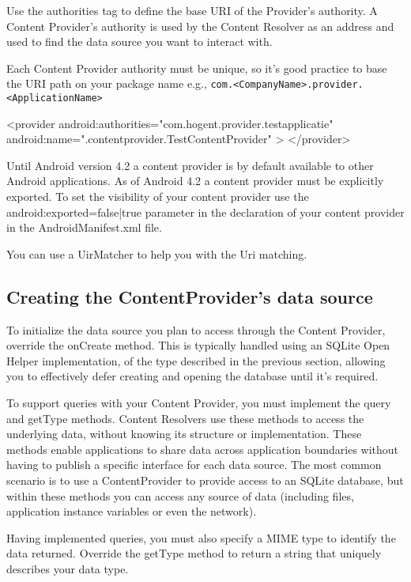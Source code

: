 Use the authorities tag to define the base URI of the Provider’s authority. A Content Provider’s authority is used by the Content Resolver as an address and used to find the data source you want to interact with.

\begin{framed}
Each Content Provider authority must be unique, so it’s good practice to base the URI path on your package name e.g., \texttt{com.<CompanyName>.provider.<ApplicationName>}
\end{framed}

\begin{xml}
<provider
android:authorities="com.hogent.provider.testapplicatie"
android:name=".contentprovider.TestContentProvider" >
</provider>
\end{xml}

Until Android version 4.2 a content provider is by default available to other Android applications. As of Android 4.2 a content provider must be explicitly exported. To set the visibility of your content provider use the android:exported=false|true parameter in the declaration of your content provider in the AndroidManifest.xml file.

You can use a UirMatcher to help you with the Uri matching.

\subsection{Creating the ContentProvider's data source}
To initialize the data source you plan to access through the Content Provider, override the onCreate method. This is typically handled using an SQLite Open Helper implementation, of the type described in the previous section, allowing you to effectively defer creating and opening the database until it’s required.

To support queries with your Content Provider, you must implement the query and getType methods. Content Resolvers use these methods to access the underlying data, without knowing its structure or implementation. These methods enable applications to share data across application boundaries without having to publish a specific interface for each data source. The most common scenario is to use a ContentProvider to provide access to an SQLite database, but within these methods you can access any source of data (including files, application instance variables or even the network).

Having implemented queries, you must also specify a MIME type to identify the data returned. Override the getType method to return a string that uniquely describes your data type.

